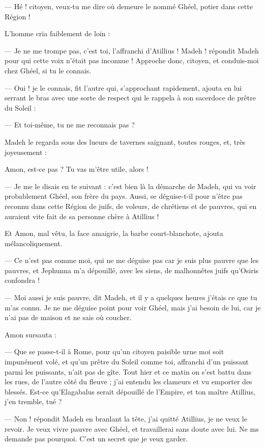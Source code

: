 \documentclass[a4paper, 11pt, oneside, polutonikogreek, french]{article}
\begin{document}
--- Hé ! citoyen, veux-tu me dire où demeure le nommé Ghéel, potier dans cette Région !

L'homme cria faiblement de loin :

--- Je ne me trompe pas, c'est toi, l'affranchi d'Atillius ! Madeh ! répondit Madeh pour qui cette voix n'était pas inconnue ! Approche donc, citoyen, et conduis-moi chez Ghéel, si tu le connais.

--- Oui ! je le connais, fit l'autre qui, s'approchant rapidement, ajouta en lui serrant le bras avec une sorte de respect qui le rappela à son sacerdoce de prêtre du Soleil :

--- Et toi-même, tu ne me reconnais pas ?

Madeh le regarda sous des lueurs de tavernes saignant, toutes rouges, et, très joyeusement :

Amon, est-ce pas ? Tu vas m'être utile, alors ! 

--- Je me le disais en te suivant : c'est bien là la démarche de Madeh, qui va voir probablement Ghéel, son frère du pays. Aussi, se déguise-t-il pour n'être pas reconnu dans cette Région de juifs, de voleurs, de chrétiens et de pauvres, qui en auraient vite fait de sa personne chère à Atillius !

Et Amon, mal vêtu, la face amaigrie, la barbe court-blanchote, ajouta mélancoliquement.

--- Ce n'est pas comme moi, qui ne me déguise pas car je suis plus pauvre que les pauvres, et Jephunna m'a dépouillé, avec les siens, de malhonnêtes juifs qu'Osiris confondra !

--- Moi aussi je suis pauvre, dit Madeh, et il y a quelques heures j’étais ce que tu m'as connu. Je ne me déguise point pour voir Ghéel, mais j'ai besoin de lui, car je n'ai pas de maison et ne sais où coucher.

Amon sursauta :

--- Que se passe-t-il à Rome, pour qu'un citoyen paisible urne moi soit impunément volé, et qu'un prêtre du Soleil comme toi, affranchi d'un puissant parmi les puissants, n'ait pas de gîte. Tout hier et ce matin on s'est battu dans les rues, de l'autre côté du fleuve ; j'ai entendu les clameurs et vu emporter des blessés. Est-ce qu'Elagabalus serait dépouillé de l'Empire, et ton maître Atillius, j'en tremble, tué ?

--- Non ! répondit Madeh en branlant la tête, j'ai quitté Atillius, je ne veux le revoir. Je veux vivre pauvre avec Ghéel, et travaillerai sans doute avec lui. Ne ms demande pas pourquoi. C'est un secret que je veux garder.
\end{document}
